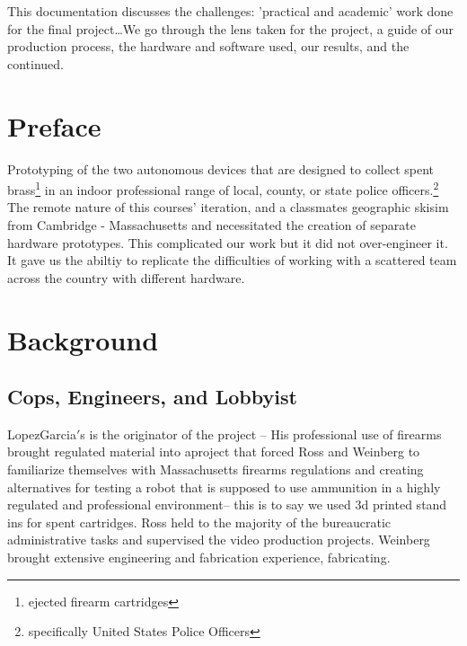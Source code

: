 \documentclass{scrarticle}
\begin{document}
\setcounter{page}{000}

\drop This documentation discusses the challenges: 'practical and academic' work done for the final project\ldots We go through the lens taken for the project, a guide of our production process, the hardware and software used, our results, and the continued.  
\section{Preface}
Prototyping of the two autonomous devices that are designed to collect spent brass\footnote{ejected firearm cartridges} in an indoor professional range of local, county, or state police officers.\footnote{{specifically United States Police Officers}} The remote nature of this courses' iteration, and a classmates geographic skisim from Cambridge - Massachusetts and necessitated the creation of separate hardware prototypes. This complicated our work but it did not over-engineer it. It gave us the abiltiy to replicate the difficulties of working with a scattered team across the country with different hardware.   

\section{Background}
\subsection{ Cops, Engineers, and Lobbyist}
LopezGarcia$'$s is the originator of the project -- His professional use of firearms brought regulated material into aproject that forced Ross and Weinberg to familiarize themselves with Massachusetts firearms regulations and creating alternatives for testing a robot that is supposed to use ammunition in a highly regulated and professional environment-- this is to say we used 3d printed stand ins for spent cartridges. Ross held to the majority of the bureaucratic administrative tasks and supervised the video production projects. Weinberg brought extensive engineering and fabrication experience, fabricating. 
\end{document}
